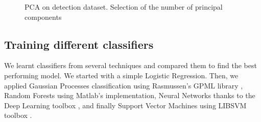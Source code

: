 \documentclass{article}
\begin{document}
   \begin{figure}[ht]
       \center
    	\hfill
	\caption{PCA on detection dataset. Selection of the number of principal components}
  \end{figure}

  \subsection{Training different classifiers}
  We learnt classifiers from several techniques and compared them to find the best performing model. We started with a simple Logistic Regression. Then, we applied Gaussian Processes classification using Rasmussen's GPML library \cite{gpmltoolbox}, Random Forests using Matlab's implementation, Neural Networks thanks to the Deep Learning toolbox \cite{deeplearningtoolbox}, and finally Support Vector Machines using LIBSVM toolbox \cite{libsvmtoolbox}.\\
\end{document}
